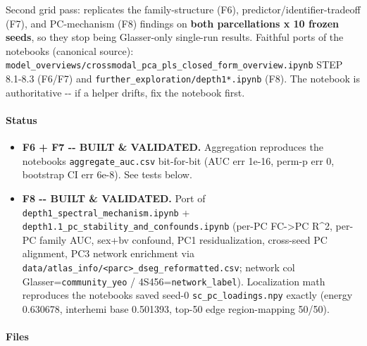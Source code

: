 Second grid pass: replicates the family-structure (F6), predictor/identifier-tradeoff (F7), and PC-mechanism (F8) findings on \textbf{both parcellations x 10 frozen seeds}, so they stop being Glasser-only single-run results. Faithful ports of the notebooks (canonical source): \texttt{model\_overviews/crossmodal\_pca\_pls\_closed\_form\_overview.ipynb} STEP 8.1-8.3 (F6/F7) and \texttt{further\_exploration/depth1*.ipynb} (F8). The notebook is authoritative -\/- if a helper drifts, fix the notebook first.

\paragraph{Status}\label{status}

\begin{itemize}
\tightlist
\item
  \textbf{F6 + F7 -\/- BUILT \& VALIDATED.} Aggregation reproduces the notebook\textquotesingle s \texttt{aggregate\_auc.csv} bit-for-bit (AUC err 1e-16, perm-p err 0, bootstrap CI err 6e-8). See tests below.
\item
  \textbf{F8 -\/- BUILT \& VALIDATED.} Port of \texttt{depth1\_spectral\_mechanism.ipynb} + \texttt{depth1.1\_pc\_stability\_and\_confounds.ipynb} (per-PC FC-\textgreater PC R\^{}2, per-PC family AUC, sex+bv confound, PC1 residualization, cross-seed PC alignment, PC3 network enrichment via \texttt{data/atlas\_info/\textless{}parc\textgreater{}\_dseg\_reformatted.csv}; network col Glasser=\texttt{community\_yeo} / 4S456=\texttt{network\_label}). Localization math reproduces the notebook\textquotesingle s saved seed-0 \texttt{sc\_pc\_loadings.npy} exactly (energy 0.630678, interhemi base 0.501393, top-50 edge region-mapping 50/50).
\end{itemize}

\paragraph{Files}\label{files-6}

